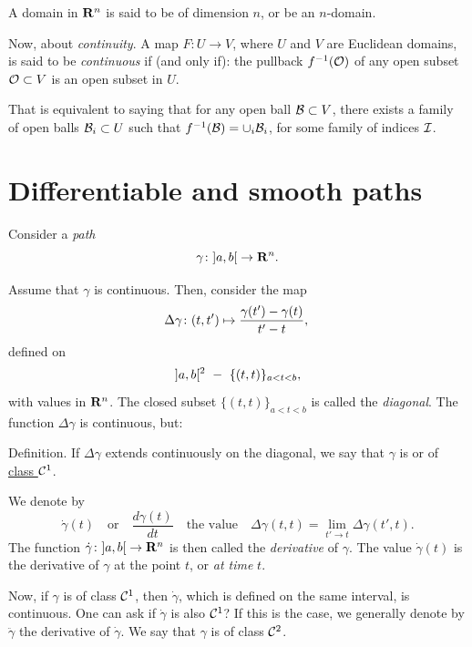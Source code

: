 A domain in $\mathbf{R}^n$ is said to be of dimension $n$,
or be an $n$-domain.

Now,
about \emph{continuity}.
A map $F \colon U \to V$,
where $U$ and $V$ are Euclidean domains,
is said to be \emph{continuous} if (and only if):
the pullback $f^{-1}(\mathcal{O})$ of any open subset $\mathcal{O} \subset V$ is an open subset in $U$.

That is equivalent to saying that for any open ball $\mathcal{B} \subset V$,
there exists a family of open balls $\mathcal{B}_i \subset U$ such that $f^{-1}(\mathcal{B}) = \cup_i \mathcal{B}_i$,
for some family of indices $\mathcal{I}$.


\section{Differentiable and smooth paths}

Consider a \emph{path}
$$%
  \gamma \colon \OpenInterval{a,b} \to \RR^n.
  $$%

Assume that $\gamma$ is continuous.
Then,
consider the map
$$%
  \Delta\gamma \colon (t,t') \mapsto \frac{\gamma(t') - \gamma(t)}{t'-t}, \\
  $$%
defined on
$$%
  \OpenInterval{a,b}^2 \ - \ \{(t,t)\}_{a<t<b},
  $$%
with values in $\mathbf{R}^n$.
The closed subset $\{(t,t)\}_{a<t<b}$ is called the \emph{diagonal}.
The function $\Delta \gamma$ is continuous,
but:

\begin{Article}{Definition.}{\itshape}
  If $\Delta\gamma$ extends continuously on the diagonal,
  we say that $\gamma$ is  or of \underline{class ${\mathcal{C}}^{1}$}.
\end{Article}

We denote by
$$%
  \dot\gamma(t)
  \quad \text{or} \quad
  \frac{d\gamma(t)}{dt}
  \quad \text{the value} \quad \Delta\gamma(t,t) = \lim_{t' \to t} \Delta\gamma(t',t).
  $$%
The function $\dot\gamma \colon \mathopen] a,b \mathclose[ \to \mathbf{R}^n$ is then called the \emph{derivative} of $\gamma$.
The value $\dot\gamma(t)$ is the derivative of $\gamma$ at the point $t$,
or {\itshape at time} $t$.

Now,
if $\gamma$ is of class ${\mathcal{C}}^{1}$,
then $\dot\gamma$,
which is defined on the same interval,
is continuous.
One can ask if $\dot\gamma$ is also ${\mathcal{C}}^{1}$?
If this is the case,
we generally denote by $\ddot\gamma$ the derivative of $\dot\gamma$.
We say that $\gamma$ is of class ${\mathcal{C}}^{2}$.

